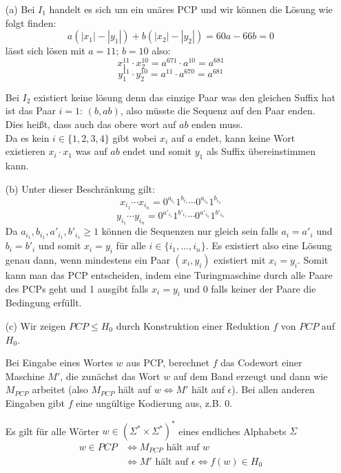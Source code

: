 \documentclass[a4paper,onecolumn,oneside,12pt,ngerman]{article}
\theoremstyle{plain} %
\theoremstyle{definition} %
\theoremstyle{remark} %
\theoremstyle{plain}
\begin{document}
\begin{enumerate}
  \item[(a)] 
Bei $I_1$ handelt es sich um ein unäres PCP und wir können die Lösung wie folgt finden:
$$a(|x_1|-|y_1|) + b(|x_2|-|y_2|) = 60a - 66b = 0$$
lässt sich lösen mit $a=11;\, b=10$ also: 
$$x_1^{11}\cdot x_2^{10} = a^{671}\cdot a^{10} = a^{681}$$
$$y_1^{11}\cdot y_2^{10} = a^{11}\cdot a^{670} = a^{681}$$

Bei $I_2$ existiert keine lösung denn das einzige Paar was den gleichen Suffix hat ist das Paar $i=1:\,(b,ab)$, also müsste die Sequenz auf den Paar enden.\\
Dies heißt, dass auch das obere wort auf $ab$ enden muss.\\
Da es kein $i\in\{1,2,3,4\}$ gibt wobei $x_i$ auf $a$ endet, kann keine Wort existieren $x_i\cdot x_1$ was auf $ab$ endet und somit $y_1$ als Suffix übereinstimmen kann.
  \item[(b)] Unter dieser Beschränkung gilt: 
  $$x_{i_1} \cdots x_{i_n} = 0^{a_{i_1}}1^{b_{i_1}}\cdots 0^{a_{i_n}}1^{b_{i_n}}$$
  $$y_{i_1} \cdots y_{i_n} = 0^{a'_{i_1}}1^{b'_{i_1}}\cdots 0^{a'_{i_n}}1^{b'_{i_n}}$$
  Da $a_{i_1},b_{i_1},a'_{i_1},b'_{i_1}\geq 1$ können die Sequenzen nur gleich sein falls $a_i = a'_i$ und $b_i = b'_i$ und somit $x_i = y_i$ für alle $i\in \{i_1,...,i_n\}$.
  Es existiert also eine Lösung genau dann, wenn mindestens ein Paar $(x_i, y_i)$ existiert mit $x_i = y_i$. Somit kann man das PCP entscheiden, indem eine Turingmaschine durch
  alle Paare des PCPs geht und 1 ausgibt falls $x_i=y_i$ und 0 falls keiner der Paare die Bedingung erfüllt.
  \item[(c)] Wir zeigen $PCP\leq H_0$ durch Konstruktion einer Reduktion $f$ von $PCP$ auf $H_0$.
  
  Bei Eingabe eines Wortes $w$ aus PCP, berechnet $f$ das Codewort einer Maschine $M'$, die zunächst das Wort $w$ auf dem Band erzeugt
  und dann wie $M_{PCP}$ arbeitet (also $M_{PCP}$ hält auf $w\Leftrightarrow M'$ hält auf $\epsilon$). Bei allen anderen Eingaben gibt $f$ eine ungültige Kodierung aus, z.B. 0.

  Es gilt für alle Wörter $w\in(\Sigma^\ast\times\Sigma^\ast)^\ast$ eines endliches Alphabets $\Sigma$
  \begin{align*}
    w \in PCP &\Leftrightarrow M_{PCP} \text{ hält auf } w\\
    &\Leftrightarrow M' \text{ hält auf }\epsilon\Leftrightarrow f(w)\in H_0
  \end{align*}
\end{enumerate}
\end{document}
